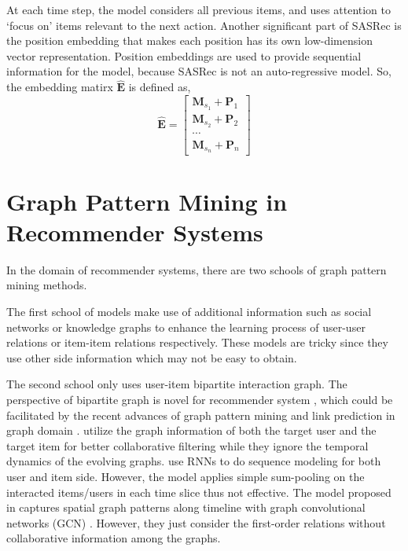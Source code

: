 At each time step, the model considers all previous items, and uses attention to ‘focus on’ items relevant to the next action.
Another significant part of SASRec is the position embedding that makes each position has its
own low-dimension vector representation. Position embeddings are used to provide
sequential information for the model, because SASRec is not an auto-regressive model.
So, the embedding matirx $\widehat{\mathbf{E}}$ is defined as,
\begin{equation}
\widehat{\mathbf{E}}=\left[ \begin{array}{c}{\mathbf{M}_{s_{1}}+\mathbf{P}_{1}} \\ {\mathbf{M}_{s_{2}}+\mathbf{P}_{2}} \\ {\cdots} \\ {\mathbf{M}_{s_{n}}+\mathbf{P}_{n}}\end{array}\right]
\end{equation}

\section{Graph Pattern Mining in Recommender Systems}
In the domain of recommender systems, there are two schools of graph pattern mining methods.

The first school of models make use of additional information such as social networks \cite{song2019session,wu2019dual} or knowledge graphs \cite{wang2018ripplenet} to enhance the learning process of user-user relations or item-item relations respectively. These models are tricky since they use other side information which may not be easy to obtain.

The second school only uses user-item bipartite interaction graph.
The perspective of bipartite graph is novel for recommender system \cite{fadel2018link}, which could be facilitated by the recent advances of graph pattern mining \cite{kipf2016semi} and link prediction in graph domain \cite{van2017graph}.
\cite{niu2018collaborative} utilize the graph information of both the target user and the target item for better collaborative filtering while they ignore the temporal dynamics of the evolving graphs.
\cite{wu2017recurrent} use RNNs to do sequence modeling for both user and item side. However, the model applies simple sum-pooling on the interacted items/users in each time slice thus not effective.
The model proposed in \cite{fadel2018link} captures spatial graph patterns along timeline with graph convolutional networks (GCN) \cite{van2017graph}. However, they just consider the first-order relations without collaborative information among the graphs.

